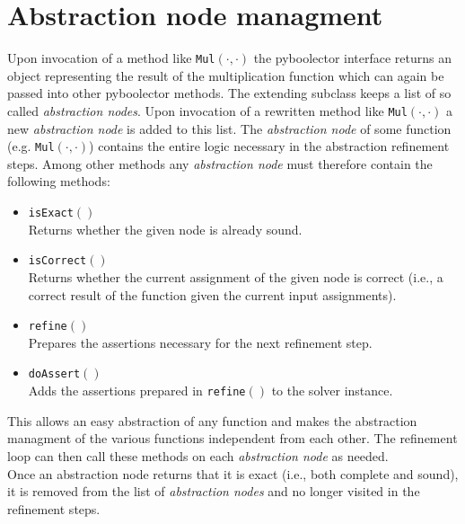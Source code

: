 \section{Abstraction node managment}
Upon invocation of a method like \texttt{Mul$\left(\cdot,\cdot\right)$} the pyboolector interface returns an object representing the result of the
multiplication function which can again be passed into other pyboolector methods.
The extending subclass keeps a list of so called \textit{abstraction nodes}. Upon invocation of a rewritten method like \texttt{Mul$\left(\cdot,\cdot\right)$} a new \textit{abstraction node}
is added to this list. The \textit{abstraction node} of some function (e.g. \texttt{Mul$\left(\cdot,\cdot\right)$}) contains the entire logic necessary in the abstraction refinement steps.
Among other methods any \textit{abstraction node} must therefore contain the following methods:
\begin{itemize}
    \item \texttt{isExact$\left(\right)$}\\
    Returns whether the given node is already sound.
    \item \texttt{isCorrect$\left(\right)$}\\
    Returns whether the current assignment of the given node is correct (i.e., a correct result of the function given the current input assignments).
    \item \texttt{refine$\left(\right)$}\\
    Prepares the assertions necessary for the next refinement step.
    \item \texttt{doAssert$\left(\right)$}\\
    Adds the assertions prepared in \texttt{refine$\left(\right)$} to the solver instance.
\end{itemize}
This allows an easy abstraction of any function and makes the abstraction managment of the various functions independent from each other.
The refinement loop can then call these methods on each \textit{abstraction node} as needed.\\
Once an abstraction node returns that it is exact (i.e., both complete and sound), it is removed from the list of \textit{abstraction nodes} and no longer visited in the refinement steps.
